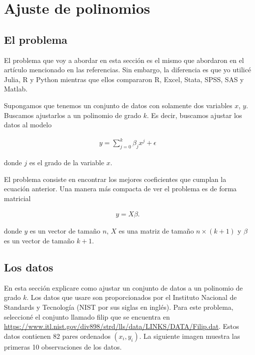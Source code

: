 \chapter{Ajuste de polinomios}

\section{El problema}
El problema que voy a abordar en esta sección es el mismo que abordaron \cite{laberintos} en el artículo mencionado en las referencias. Sin embargo, la diferencia es que yo utilicé Julia, R y Python  mientras que ellos compararon R, Excel, Stata, SPSS, SAS y Matlab. 

Supongamos que tenemos un conjunto de datos con solamente dos variables $x$, $y$. Buscamos ajustarlos a un polinomio de grado $k$. Es decir, buscamos ajustar los datos al modelo

\begin{equation*} 
    \begin{aligned}
    y = \sum_{j = 0}^{k} \beta_j x^j + \epsilon
    \end{aligned}
\end{equation*}

donde $j$ es el grado de la variable $x$. 

El problema consiste en encontrar los mejores coeficientes que cumplan la ecuación anterior. Una manera más compacta de ver el problema es de forma matricial 

\begin{equation}
\label{eq_matricial_pol}
    \begin{aligned}
    y = X \beta.
    \end{aligned}
\end{equation}

donde $y$ es un vector de tamaño $n$, $X$ es una matriz de tamaño $n \times (k + 1)$ y $\beta$ es un vector de tamaño $k + 1$. 


\section{Los datos}
En esta sección explicare como ajustar un conjunto de datos a un polinomio de grado $k$. Los datos que usare son proporcionados por el Instituto Nacional de Standards y Tecnología (NIST por sus siglas en inglés). Para este problema, seleccioné el conjunto llamado filip que se encuentra en \url{https://www.itl.nist.gov/div898/strd/lls/data/LINKS/DATA/Filip.dat}. Estos datos contienen 82 pares ordenados $(x_i, y_i)$. La siguiente imagen muestra las primeras 10 observaciones de los datos. 

